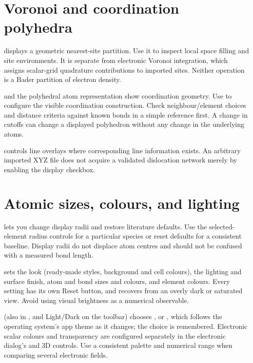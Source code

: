 \section{Voronoi and coordination polyhedra}
 displays a geometric nearest-site partition. Use it to inspect local space filling and site environments. It is separate from electronic Voronoi integration, which assigns scalar-grid quadrature contributions to imported sites. Neither operation is a Bader partition of electron density.

 and the polyhedral atom representation show coordination geometry. Use  to configure the visible coordination construction. Check neighbour/element choices and distance criteria against known bonds in a simple reference first. A change in cutoffs can change a displayed polyhedron without any change in the underlying atoms.

 controls line overlays where corresponding line information exists. An arbitrary imported XYZ file does not acquire a validated dislocation network merely by enabling the display checkbox.

\section{Atomic sizes, colours, and lighting}
 lets you change display radii and restore literature defaults. Use the selected-element radius controls for a particular species or reset defaults for a consistent baseline. Display radii do not displace atom centres and should not be confused with a measured bond length.

 sets the look (ready-made styles, background and cell colours), the lighting and surface finish, atom and bond sizes and colours, and element colours. Every setting has its own Reset button, and  recovers from an overly dark or saturated view. Avoid using visual brightness as a numerical observable.

 (also in , and Light/Dark on the toolbar) chooses ,  or , which follows the operating system's app theme as it changes; the choice is remembered. Electronic scalar colours and transparency are configured separately in the electronic dialog's  and 3D controls. Use a consistent palette and numerical range when comparing several electronic fields.

